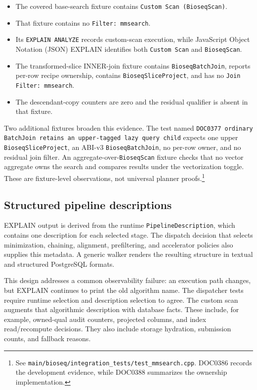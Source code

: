 \begin{itemize}
  \item The covered base-search fixture contains
  \texttt{Custom Scan (BioseqScan)}.
  \item That fixture contains no \texttt{Filter: mmsearch}.
  \item Its \texttt{EXPLAIN ANALYZE} records custom-scan execution, while
  JavaScript Object Notation (JSON) EXPLAIN identifies both
  \texttt{Custom Scan} and \texttt{BioseqScan}.
  \item The transformed-slice INNER-join fixture contains
  \texttt{BioseqBatchJoin}, reports per-row recipe ownership, contains
  \texttt{BioseqSliceProject}, and has no
  \texttt{Join Filter: mmsearch}.
  \item The descendant-copy counters are zero and the residual qualifier is
  absent in that fixture.
\end{itemize}

Two additional fixtures broaden this evidence.  The test named
\texttt{DOC0377 ordinary BatchJoin retains an upper-tagged lazy query child}
expects one upper \texttt{BioseqSliceProject}, an ABI-v3
\texttt{BioseqBatchJoin}, no per-row owner, and no residual join filter.
An aggregate-over-\texttt{BioseqScan} fixture checks that no vector aggregate
owns the search and compares results under the vectorization toggle.
These are fixture-level observations, not universal planner proofs.\footnote{
See \texttt{main/bioseq/integration\_tests/test\_mmsearch.cpp}.  DOC0386
records the development evidence, while DOC0388 summarizes the ownership
implementation.}

\subsection{Structured pipeline descriptions}

EXPLAIN output is derived from the runtime
\texttt{PipelineDescription}, which contains one description for each
selected stage.  The dispatch decision that selects minimization, chaining,
alignment, prefiltering, and accelerator policies also supplies this metadata.
A generic walker renders the resulting structure in textual and structured
PostgreSQL formats.

This design addresses a common observability failure: an execution path
changes, but EXPLAIN continues to print the old algorithm name.  The
dispatcher tests require runtime selection and description selection to
agree.  The custom scan augments that algorithmic description with database
facts.  These include, for example, owned-qual audit counters, projected
columns, and index read/recompute decisions.  They also include storage
hydration, submission counts, and fallback reasons.


